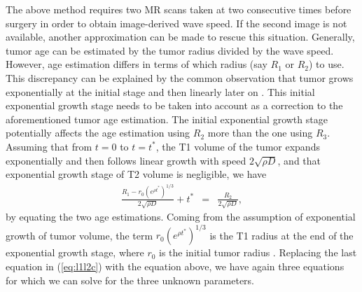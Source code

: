 \documentclass{aims}
\numberwithin{equation}{section}
\begin{document}
The above method requires two MR scans taken at two consecutive times
before surgery in order to obtain image-derived wave speed. If the
second image is not available, another approximation can be made to
rescue this situation. Generally, tumor age can be estimated by the
tumor radius divided by the wave speed. However, age estimation differs
in terms of which radius (say $R_{1}$ or $R_{2}$) to use. This discrepancy
can be explained by the common observation that tumor grows exponentially
at the initial stage and then linearly later on \cite{Kuang}. This
initial exponential growth stage needs to be taken into account as
a correction to the aforementioned tumor age estimation. The initial
exponential growth stage potentially affects the age estimation using
$R_{2}$ more than the one using $R_{3}$. Assuming that from $t=0$
to $t=t^{*}$, the T1 volume of the tumor expands exponentially and
then follows linear growth with speed $2\sqrt{\rho D}$, and that
exponential growth stage of T2 volume is negligible, we have 
\begin{eqnarray}
\frac{R_{1}-r_{0}(e^{\rho t^{*}})^{1/3}}{2\sqrt{\rho D}}+t^{*} & = & \frac{R_{2}}{2\sqrt{\rho D}},
\end{eqnarray}
by equating the two age estimations. Coming from the assumption of exponential growth of tumor volume, the term $r_{0}(e^{\rho t^{*}})^{1/3}$ is the T1 radius at the end of the exponential growth stage, where $r_0$ is the initial tumor radius . Replacing the last equation in (\ref{eq:l1l2c})
with the equation above, we have again three equations for which we
can solve for the three unknown parameters. 
\end{document}
